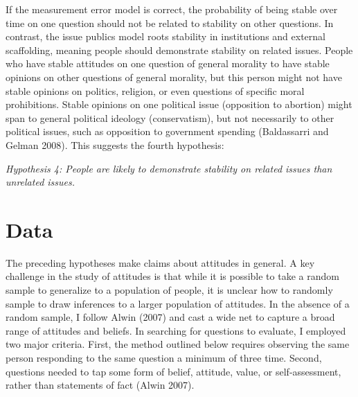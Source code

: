 \documentclass[12pt,]{article}
\begin{document}
If the measurement error model is correct, the probability of being stable over time on one question should not be related to stability on other questions. In contrast, the issue publics model roots stability in institutions and external scaffolding, meaning people should demonstrate stability on related issues. People who have stable attitudes on one question of general morality to have stable opinions on other questions of general morality, but this person might not have stable opinions on politics, religion, or even questions of specific moral prohibitions. Stable opinions on one political issue (opposition to abortion) might span to general political ideology (conservatism), but not necessarily to other political issues, such as opposition to government spending (Baldassarri and Gelman 2008). This suggests the fourth hypothesis:

\emph{Hypothesis 4: People are likely to demonstrate stability on related issues than unrelated issues.}

\hypertarget{data}{%
\section{Data}\label{data}}

The preceding hypotheses make claims about attitudes in general. A key challenge in the study of attitudes is that while it is possible to take a random sample to generalize to a population of people, it is unclear how to randomly sample to draw inferences to a larger population of attitudes. In the absence of a random sample, I follow Alwin (2007) and cast a wide net to capture a broad range of attitudes and beliefs. In searching for questions to evaluate, I employed two major criteria. First, the method outlined below requires observing the same person responding to the same question a minimum of three time. Second, questions needed to tap some form of belief, attitude, value, or self-assessment, rather than statements of fact (Alwin 2007).
\end{document}
